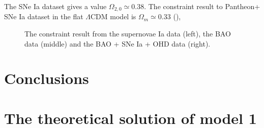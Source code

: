 \documentclass[twocolumn]{aastex631}
\begin{document}
   The SNe Ia dataset gives a value $\Omega_{2,0} \simeq 0.38$. The constraint result to Pantheon+
   SNe Ia dataset in the flat $\Lambda$CDM model is $\Omega_{m} \simeq 0.33$ (\cite{Borghi_2022}),
   
   \begin{figure}
      \centering
      \caption{The constraint result from the supernovae Ia data
      (left), the BAO data (middle) and the BAO + SNe Ia + OHD data (right).}
      \label{fig:2}
   \end{figure}

\section{Conclusions}\label{sec:5}

\appendix

\section{The theoretical solution of model 1}
\end{document}
